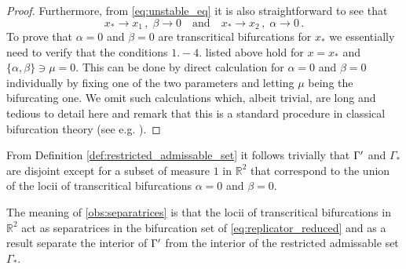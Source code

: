 \documentclass[../main.tex]{subfiles}
\begin{document}
\begin{proof}
     Furthermore, from \eqref{eq:unstable_eq} it is also straightforward to see that
     \begin{equation*}
          x_{*}\to x_{1}\,,\;\beta\to0\quad \text{and} \quad x_{*}\to x_{2} \,,\;\alpha\to0\,.
     \end{equation*}
     To prove that $\alpha=0$ and $\beta=0$ are transcritical bifurcations for $x_{*}$ we essentially need to verify that the conditions $1.-4.$ listed above hold for $x=x_{*}$ and $\{\alpha,\beta\}\ni\mu=0$.
     This can be done by direct calculation for $\alpha=0$ and $\beta=0$ individually by fixing one of the two parameters and letting $\mu$ being the bifurcating one.
     We omit such calculations which, albeit trivial, are long and tedious to detail here and remark that this is a standard procedure in classical bifurcation theory (see e.g. \cite{Glendinning94}).
\end{proof}

\begin{observation}\label{obs:separatrices}
     From Definition \ref{def:restricted_admissable_set} it follows trivially that $\Gamma'$ and $\Gamma_{*}$ are disjoint except for a subset of measure $1$ in $\mathbb{R}^{2}$ that correspond to the union of the locii of transcritical bifurcations $\alpha = 0$ and $\beta = 0$.
\end{observation}

The meaning of \ref{obs:separatrices} is that the locii of transcritical bifurcations in $\mathbb{R}^{2}$ act as separatrices in the bifurcation set of \eqref{eq:replicator_reduced} and as a result separate the interior of $\Gamma'$ from the interior of the restricted admissable set $\Gamma_{*}$.


\end{document}

